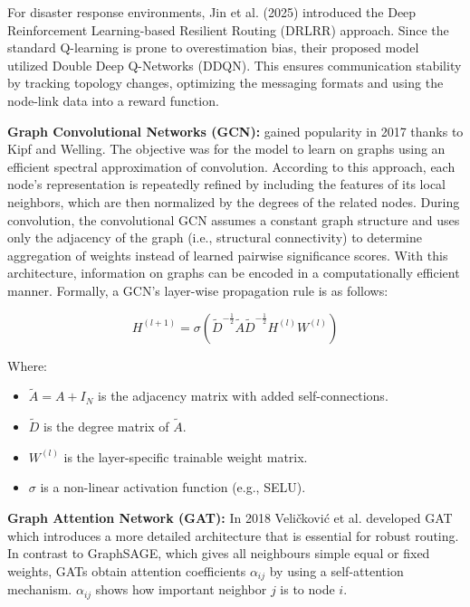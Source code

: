 \documentclass[conference]{IEEEtran}
\begin{document}
For disaster response environments, Jin et al. (2025) introduced the Deep Reinforcement Learning-based Resilient Routing (DRLRR) approach. Since the standard Q-learning is prone to overestimation bias, their proposed model utilized Double Deep Q-Networks (DDQN). This ensures communication stability by tracking topology changes, optimizing the messaging formats and using the node-link data into a reward function.

\textbf{Graph Convolutional Networks (GCN):} gained popularity in 2017 thanks to Kipf and Welling. The objective was for the model to learn on graphs using an efficient spectral approximation of convolution. According to this approach, each node's representation is repeatedly refined by including the features of its local neighbors, which are then normalized by the degrees of the related nodes. During convolution, the convolutional GCN assumes a constant graph structure and uses only the adjacency of the graph (i.e., structural connectivity) to determine aggregation of weights instead of learned pairwise significance scores. With this architecture, information on graphs can be encoded in a computationally efficient manner. Formally, a GCN's layer-wise propagation rule is as follows:

\begin{equation}
H^{(l+1)} = \sigma\left(\tilde{D}^{-\frac{1}{2}}\tilde{A}\tilde{D}^{-\frac{1}{2}}H^{(l)}W^{(l)}\right)
\end{equation}

\noindent Where:
\begin{itemize}
    \item $\tilde{A} = A + I_N$ is the adjacency matrix with added self-connections.
    \item $\tilde{D}$ is the degree matrix of $\tilde{A}$.
    \item $W^{(l)}$ is the layer-specific trainable weight matrix.
    \item $\sigma$ is a non-linear activation function (e.g., SELU).
\end{itemize}

\textbf{Graph Attention Network (GAT):} In 2018 Veli\v{c}kovi\'{c} et al. developed GAT which introduces a more detailed architecture that is essential for robust routing. In contrast to GraphSAGE, which gives all neighbours simple equal or fixed weights, GATs obtain attention coefficients $\alpha_{ij}$ by using a self-attention mechanism. $\alpha_{ij}$ shows how important neighbor $j$ is to node $i$.
\end{document}
